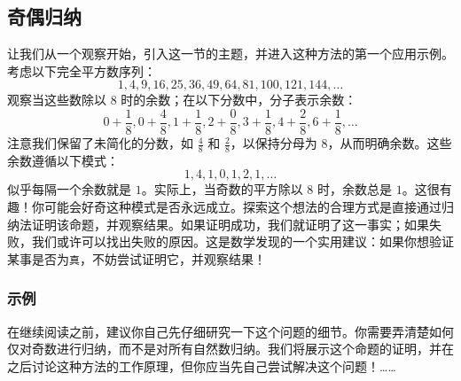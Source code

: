 \subsection{奇偶归纳}

让我们从一个观察开始，引入这一节的主题，并进入这种方法的第一个应用示例。考虑以下完全平方数序列：
\[1, 4, 9, 16, 25, 36, 49, 64, 81, 100, 121, 144, \dots\]
观察当这些数除以 $8$ 时的余数；在以下分数中，分子表示余数：
\[0+\frac{1}{8}, 0+\frac{4}{8}, 1+\frac{1}{8}, 2+\frac{0}{8}, 3+\frac{1}{8}, 4+\frac{2}{8}, 6+\frac{1}{8},  \dots\]
注意我们保留了未简化的分数，如 $\frac{4}{8}$ 和 $\frac{2}{8}$，以保持分母为 $8$，从而明确余数。这些余数遵循以下模式：
\[1, 4, 1, 0, 1, 2, 1, \dots\]
似乎每隔一个余数就是 $1$。实际上，当奇数的平方除以 $8$ 时，余数总是 $1$。这很有趣！你可能会好奇这种模式是否永远成立。探索这个想法的合理方式是直接通过归纳法证明该命题，并观察结果。如果证明成功，我们就证明了这一事实；如果失败，我们或许可以找出失败的原因。这是数学发现的一个实用建议：如果你想验证某事是否为\verb|真|，不妨尝试证明它，并观察结果！

\subsubsection*{示例}

在继续阅读之前，建议你自己先仔细研究一下这个问题的细节。你需要弄清楚如何仅对奇数进行归纳，而不是对所有自然数归纳。我们将展示这个命题的证明，并在之后讨论这种方法的工作原理，但你应当先自己尝试解决这个问题！……


